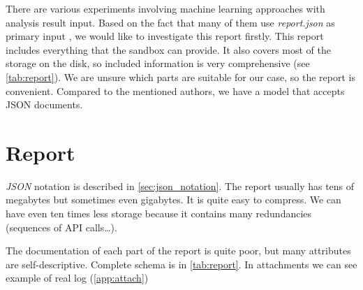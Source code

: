 There are various experiments involving machine learning approaches with analysis result input. Based on the fact that many of them use \emph{report.json} as primary input \cite{Darshan2016, Dinh2019a, Kim2020, Sethi2019}, we would like to investigate this report firstly. This report includes everything that the sandbox can provide. It also covers most of the storage on the disk, so included information is very comprehensive (see \ref{tab:report}). We are unsure which parts are suitable for our case, so the report is convenient. Compared to the mentioned authors, we have a model that accepts JSON documents.


\section{Report}
\emph{JSON} notation is described in \ref{sec:json_notation}. The report usually has tens of megabytes but sometimes even gigabytes. It is quite easy to compress. We can have even ten times less storage because it contains many redundancies (sequences of API calls\dots). 

The documentation of each part of the report is quite poor, but many attributes are self-descriptive. Complete schema is in \ref{tab:report}. In attachments we can see example of real log (\ref{app:attach})

